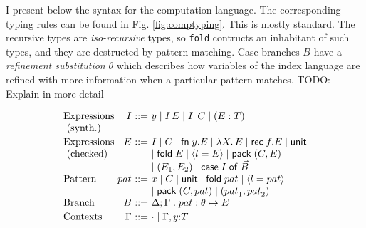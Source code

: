 \documentclass{article}
\newcommand{\LONGVERSION}[1]{{\color{light-gray}#1}}
\begin{document}
I present below the syntax for the computation language. The
corresponding typing rules can be found in Fig. \ref{fig:comptyping}. This
is mostly standard. The recursive types are \emph{iso-recursive}
types, so \lstinline{fold} contructs an inhabitant of such types, and
they are destructed by pattern matching. Case branches $B$ have a
\emph{refinement substitution} $\theta$ which describes how variables
of the index language are refined with more information when a
particular pattern matches. \LONGVERSION{TODO: Explain in more detail}

\[
\begin{array}{l@{~}r@{~}c@{~}l}
\mbox{Expressions} & I  & \bnfas & y 
  \bnfalt \app I E %
  \bnfalt \app I \ctxi C 
   \bnfalt  (E : T)\\
\mbox{~(synth.)} & & & 
\\[2pt]
\mbox{Expressions} & E & \bnfas &  I 
  \bnfalt C %
  \bnfalt \fn{y}{E}
  \bnfalt \mlam{X}{E} 
  \bnfalt \rec{f}{E} 
  \bnfalt \m{unit}\\
\mbox{~(checked)}& & &   \bnfalt \fold E  \bnfalt \dsum{l=E}   \bnfalt \pack (C , E) \\
&&&  \bnfalt (E_1, E_2) \bnfalt \casebox{I}{\vec{B}} \\
\mbox{Pattern } & {pat} & \bnfas & x \bnfalt C \bnfalt \m{unit} \bnfalt \fold {pat} \bnfalt \dsum{l = {pat}} \\
                         &          &            & \bnfalt \pack (C , {pat}) \bnfalt ({pat}_1, {pat}_2)\\
\mbox{Branch  } & B  & \bnfas &  \casearm{\Delta ; \Gamma\;.\; pat : \theta}{E}
\\[2pt]
\mbox{Contexts} & \Gamma  & \bnfas &  \edot \bnfalt \Gamma, y{:}T \\
\end{array}
\]  
\end{document}
